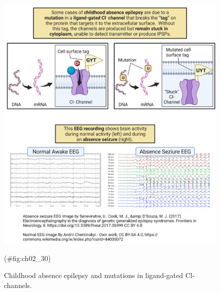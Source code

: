 \documentclass[
]{book}
\begin{document}
\begin{figure}

{\centering \includegraphics[width=0.8\linewidth]{images/ch02/02_29} 

}

\caption{Childhood absence epilepsy and mutations in ligand-gated Cl- channels.}(\#fig:ch02_30)
\end{figure}
\end{document}
